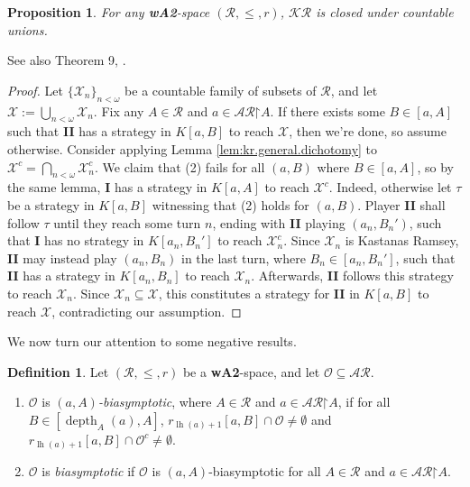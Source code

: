 \documentclass[11pt,reqno]{amsart}
\theoremstyle{plain}
\numberwithin{equation}{section}
\newtheorem{proposition}[theorem]{Proposition}
\theoremstyle{definition}
\newtheorem{definition}[theorem]{Definition}
\newcommand{\func}{\operatorname}
\newcommand{\cal}{\mathcal}
\newcommand{\bcal}[1]{\bm{\mathcal{#1}}}
\newcommand{\restrictedto}{\mathord{\upharpoonright}}
\newcommand{\X}{\cal{X}}
\newcommand{\lh}{\func{lh}}
\renewcommand{\O}{\cal{O}}
\newcommand{\depth}{\func{depth}}
\begin{document}
\begin{proposition}
\label{prop:kr.closed.under.countable.unions}
    For any \textbf{wA2}-space $(\cal{R},\leq,r)$, $\bcal{KR}$ is closed under countable unions.
\end{proposition}

See also Theorem 9, \cite{R08}.

\begin{proof}
    Let $\{\X_n\}_{n<\omega}$ be a countable family of subsets of $\cal{R}$, and let $\X := \bigcup_{n<\omega} \X_n$. Fix any $A \in \cal{R}$ and $a \in \cal{AR}\restrictedto A$. If there exists some $B \in [a,A]$ such that \textbf{II} has a strategy in $K[a,B]$ to reach $\X$, then we're done, so assume otherwise. Consider applying Lemma \ref{lem:kr.general.dichotomy} to $\X^c = \bigcap_{n<\omega} \X_n^c$. We claim that (2) fails for all $(a,B)$ where $B \in [a,A]$, so by the same lemma, \textbf{I} has a strategy in $K[a,A]$ to reach $\X^c$. Indeed, otherwise let $\tau$ be a strategy in $K[a,B]$ witnessing that (2) holds for $(a,B)$. Player \textbf{II} shall follow $\tau$ until they reach some turn $n$, ending with \textbf{II} playing $(a_n,B_n')$, such that \textbf{I} has no strategy in $K[a_n,B_n']$ to reach $\X_n^c$. Since $\X_n$ is Kastanas Ramsey, \textbf{II} may instead play $(a_n,B_n)$ in the last turn, where $B_n \in [a_n,B_n']$, such that \textbf{II} has a strategy in $K[a_n,B_n]$ to reach $\X_n$. Afterwards, \textbf{II} follows this strategy to reach $\X_n$. Since $\X_n \subseteq \X$, this constitutes a strategy for \textbf{II} in $K[a,B]$ to reach $\X$, contradicting our assumption. 
\end{proof}

We now turn our attention to some negative results. 

\begin{definition}
    Let $(\cal{R},\leq,r)$ be a \textbf{wA2}-space, and let $\O \subseteq \cal{AR}$.
    \begin{enumerate}
        \item $\O$ is \emph{$(a,A)$-biasymptotic}, where $A \in \cal{R}$ and $a \in \cal{AR}\restrictedto A$, if for all $B \in [\depth_A(a),A]$, $r_{\lh(a)+1}[a,B] \cap \O \neq \emptyset$ and $r_{\lh(a)+1}[a,B] \cap \O^c \neq \emptyset$.

        \item $\O$ is \emph{biasymptotic} if $\O$ is $(a,A)$-biasymptotic for all $A \in \cal{R}$ and $a \in \cal{AR}\restrictedto A$.
    \end{enumerate}
\end{definition}
\end{document}
